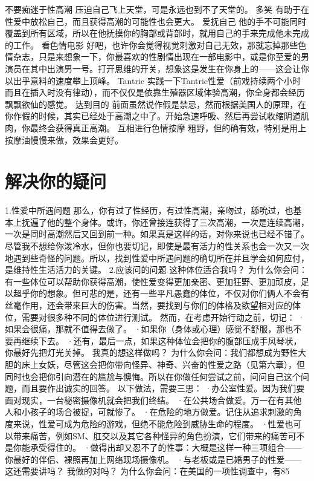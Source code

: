 \documentclass[12pt,UTF8,openany]{ctexbook}
\begin{document}
不要痴迷于性高潮
压迫自己飞上天堂，可是永远也到不了天堂的。
多笑
有助于在性爱中放松自己，而且获得高潮的可能性也会更大。
爱抚自己
他的手不可能同时覆盖到所有区域，所以在他抚摸你的胸部或背部时，就用自己的手来完成他未完成的工作。
看色情电影
好吧，也许你会觉得视觉刺激对自己无效，那就忘掉那些色情杂志，只是来想象一下，你最喜欢的性剧情出现在一部电影中，或是你至爱的男演员在其中出演男一号。打开思维的开关，想象这是发生在你身上的——这会让你以出乎意料的速度攀上顶峰。
Tantric
实践一下Tantric性爱（前戏持续两个小时而且在插入时没有律动），而不仅仅是依靠生殖器区域体验高潮，你全身都会经历飘飘欲仙的感觉。
达到目的
前面虽然说作假是禁忌，然而根据美国人的原理，在你作假的时候，其实已经处于高潮之中了。开始急速呼吸、然后再尝试收缩阴道肌肉，你最终会获得真正高潮。
互相进行色情按摩
粗野，但的确有效，特别是用上按摩油慢慢来做，效果会更好。
\chapter{解决你的疑问}
1.性爱中所遇问题
那么，你有过了性经历，有过性高潮，亲吻过，舔吮过，也基本上抚遍了他的整个身体。或许，你还曾接连获得了三次高潮，一次是连续高潮，一次是同时高潮然后又回到前一种。如果真是这样的话，对你来说也已经不错了。尽管我不想给你泼冷水，但你也要切记，即使是最有活力的性关系也会一次又一次地遇到些奇怪的问题。所以，找到性爱中所遇问题的确切所在并且学会如何应付，是维持性生活活力的关键。
2.应该问的问题
这种体位适合我吗？
为什么你会问：有一些体位可以帮助你获得高潮，使性爱变得更加亲密、更加狂野、更加顽皮，足以超乎你的想象。但可悲的是，还有一些平凡愚蠢的体位，不仅对你们俩人不会有丝毫作用，还会带来巨大的伤害。当然，要找到与你们的体格及欲望相对应的体位，需要对很多种不同的体位进行测试。
然而，在考虑开始行动之前，切记：
·如果会很痛，那就不值得去做了。
·如果你（身体或心理）感觉不舒服，那也不要再继续下去。
·还有，最后一点，如果这种体位会把你的腹部压成手风琴状，你最好先把灯光关掉。
我真的想这样做吗？
为什么你会问：我们都想成为野性大胆的床上女妖，尽管这会把你带向怪异、神奇、兴奋的性爱之路（见第六章），但同时也会把你引向潜在的尴尬与懊悔。所以在你做任何尝试之前，问问自己这个问题，而且要作出诚实的回答。
以下做法，需要三思：
·办公室性爱。因为我们要面对现实，一台秘密摄像机就会把我们终结。
·在公共场合做爱。万一在有其他人和小孩子的场合被捉，可就惨了。
·在危险的地方做爱。记住从追求刺激的角度来说，性爱可成为危险的游戏，但绝不能危险到威胁生命的程度。
·性爱也可以带来痛苦，例如SM、肛交以及其它各种怪异的角色扮演，它们带来的痛苦可不是你能承受得住的。
·做得出却又忍不了的性事：大概是这样一种三项组合——你最好的伴侣、裸照再加上网络现场摄像机。
·与老板或是已婚男子的性爱——这还需要讲吗？
我做的对吗？
为什么你会问：在美国的一项性调查中，有85%
\end{document}
